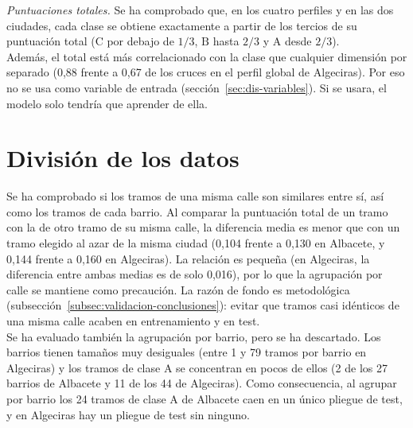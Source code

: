 \textit{Puntuaciones totales.} Se ha comprobado que, en los cuatro perfiles y en las dos ciudades, cada clase se obtiene exactamente a partir de los tercios de su puntuación total ($\mathrm{C}$ por debajo de $1/3$, $\mathrm{B}$ hasta $2/3$ y $\mathrm{A}$ desde $2/3$).
\\

Además, el total está más correlacionado con la clase que cualquier dimensión por separado (0,88 frente a 0,67 de los cruces en el perfil global de Algeciras). Por eso no se usa como variable de entrada (sección~\ref{sec:dis-variables}). Si se usara, el modelo solo tendría que aprender de ella.
\\


\section{División de los datos}
\label{sec:dis-division}

Se ha comprobado si los tramos de una misma calle son similares entre sí, así como los tramos de cada barrio. Al comparar la puntuación total de un tramo con la de otro tramo de su misma calle, la diferencia media es menor que con un tramo elegido al azar de la misma ciudad (0,104 frente a 0,130 en Albacete, y 0,144 frente a 0,160 en Algeciras). La relación es pequeña (en Algeciras, la diferencia entre ambas medias es de solo 0,016), por lo que la agrupación por calle se mantiene como precaución. La razón de fondo es metodológica (subsección~\ref{subsec:validacion-conclusiones}): evitar que tramos casi idénticos de una misma calle acaben en entrenamiento y en test.
\\

Se ha evaluado también la agrupación por barrio, pero se ha descartado. Los barrios tienen tamaños muy desiguales (entre 1 y 79 tramos por barrio en Algeciras) y los tramos de clase A se concentran en pocos de ellos (2 de los 27 barrios de Albacete y 11 de los 44 de Algeciras). Como consecuencia, al agrupar por barrio los 24 tramos de clase A de Albacete caen en un único pliegue de test, y en Algeciras hay un pliegue de test sin ninguno.
\\

